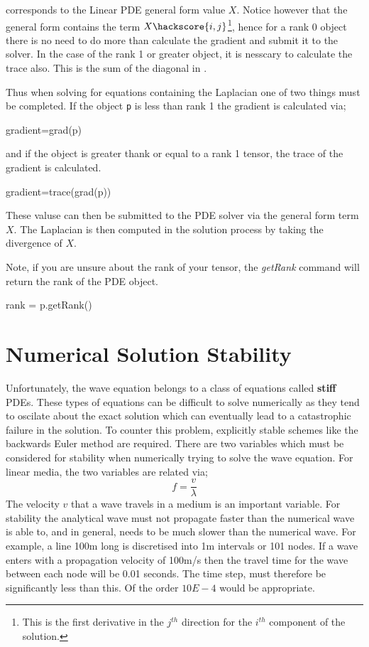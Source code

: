  corresponds to the Linear PDE general form value
$X$. Notice however that the general form contains the term $X
\hackscore{i,j}$\footnote{This is the first derivative in the $j^{th}$
direction for the $i^{th}$ component of the solution.},
hence for a rank 0 object there is no need to do more than calculate the
gradient and submit it to the solver. In the case of the rank 1 or greater
object, it is nesscary to calculate the trace also. This is the sum of the
diagonal in . 

Thus when solving for equations containing the Laplacian one of two things must
be completed. If the object \verb!p! is less than rank 1 the gradient is
calculated via;
\begin{python}
gradient=grad(p)
\end{python}
and if the object is greater thank or equal to a rank 1 tensor, the trace of
the gradient is calculated.
\begin{python}
 gradient=trace(grad(p))
\end{python}
These valuse can then be submitted to the PDE solver via the general form term
$X$. The Laplacian is then computed in the solution process by taking the
divergence of $X$.

Note, if you are unsure about the rank of your tensor, the \textit{getRank}
command will return the rank of the PDE object.
\begin{python}
 rank = p.getRank()
\end{python}


\section{Numerical Solution Stability} \label{sec:nsstab}
Unfortunately, the wave equation belongs to a class of equations called
\textbf{stiff} PDEs. These types of equations can be difficult to solve
numerically as they tend to oscilate about the exact solution which can
eventually lead to a catastrophic failure in the solution. To counter this
problem, explicitly stable schemes like
the backwards Euler method are required. There are two variables which must be
considered for stability when numerically trying to solve the wave equation.
For linear media, the two variables are related via;
\begin{equation} \label{eqn:freqvel}
f=\frac{v}{\lambda}
\end{equation}
The velocity $v$ that a wave travels in a medium is an important variable. For
stability the analytical wave must not propagate faster than the numerical wave
is able to, and in general, needs to be much slower than the numerical wave.
For example, a line 100m long is discretised into 1m intervals or 101 nodes. If
a wave enters with a propagation velocity of 100m/s then the travel time for
the wave between each node will be 0.01 seconds. The time step, must therefore
be significantly less than this. Of the order $10E-4$ would be appropriate. 

